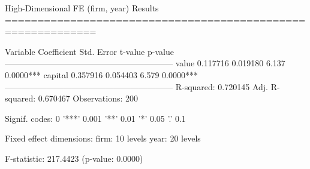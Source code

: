 
High-Dimensional FE (firm, year) Results
============================================================

Variable         Coefficient   Std. Error    t-value    p-value
------------------------------------------------------------
value               0.117716     0.019180      6.137     0.0000***
capital             0.357916     0.054403      6.579     0.0000***
------------------------------------------------------------
R-squared: 0.720145
Adj. R-squared: 0.670467
Observations: 200

Signif. codes: 0 '***' 0.001 '**' 0.01 '*' 0.05 '.' 0.1


Fixed effect dimensions:
  firm: 10 levels
  year: 20 levels

F-statistic: 217.4423 (p-value: 0.0000)

